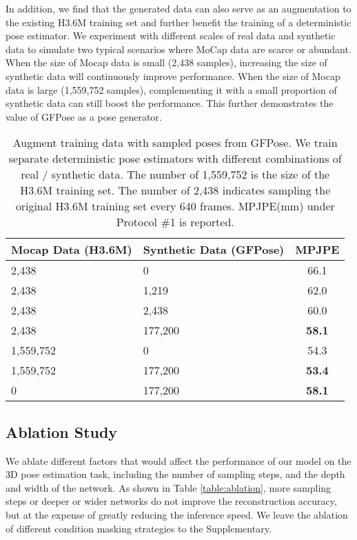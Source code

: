 \documentclass[10pt,twocolumn,letterpaper]{article}
\begin{document}
In addition, we find that the generated data can also serve as an augmentation to the existing H3.6M training set and further benefit the training of a deterministic pose estimator.  We experiment with different scales of real data and synthetic data to simulate two typical scenarios where MoCap data are scarce or abundant. 
When the size of Mocap data is small (2,438 samples), increasing the size of synthetic data will continuously improve performance.
When the size of Mocap data is large (1,559,752 samples), complementing it with a small proportion of synthetic data can still boost the performance. This further demonstrates the value of GFPose as a pose generator.



\begin{table}[t]
    \centering
    \small
\begin{tabular}{l l c}
            \toprule
            Mocap Data (H3.6M) & Synthetic Data (GFPose) & MPJPE  \\
            \midrule
            2,438 & 0 & 66.1  \\
            2,438 & 1,219 & 62.0 \\
            2,438 & 2,438 & 60.0\\
            2,438 & 177,200 & \textbf{58.1} \\
            \midrule
            1,559,752 & 0 & 54.3\\
            1,559,752 & 177,200 & \textbf{53.4}  \\
            \midrule
            0 & 177,200 & \textbf{58.1}  \\
            \bottomrule
        \end{tabular}
\vspace{-0.5em}
    \caption{Augment training data with sampled poses from GFPose. We train separate deterministic pose estimators with different combinations of real / synthetic data. The number of 1,559,752 is the size of the H3.6M training set. The number of 2,438 indicates sampling the original H3.6M training set every 640 frames. MPJPE(mm) under Protocol \#1 is reported.}
    \label{table:pose_generation}
    \vspace{-0.5em}
\end{table}


\subsection{Ablation Study}

We ablate different factors that would affect the performance of our model on the 3D pose estimation task, including the number of sampling steps, and the depth and width of the network. As shown in Table \ref{table:ablation}, more sampling steps or deeper or wider networks do not improve the reconstruction accuracy, but at the expense of greatly reducing the inference speed. We leave the ablation of different condition masking strategies to the Supplementary. 
\end{document}

